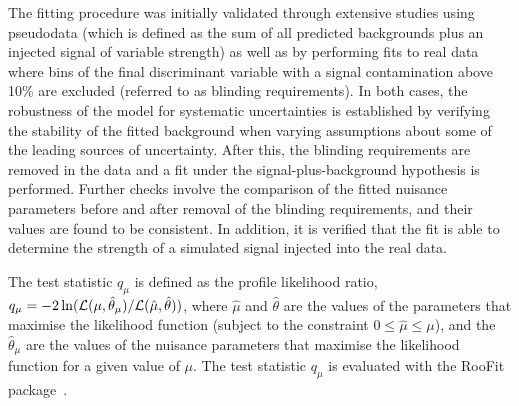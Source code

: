 The fitting procedure was initially validated through extensive studies using pseudodata (which is defined as the sum of all predicted backgrounds 
plus an injected signal of variable strength) as well as by performing fits to real data where bins of the final discriminant variable with 
a signal contamination above 10\% are excluded (referred to as blinding requirements).
In both cases, the robustness of the model for systematic uncertainties is established by verifying the stability of the fitted background 
when varying assumptions about some of the leading sources of uncertainty. 
After this, the blinding requirements
are removed in the data and a fit under the signal-plus-background hypothesis is performed. Further checks involve the comparison of the fitted 
nuisance parameters before and after removal of the blinding requirements, and their values are found to be consistent. In addition, it is verified that the 
fit is able to determine the strength of a simulated signal injected into the real data.

The test statistic $q_\mu$ is defined as the profile likelihood ratio, 
$q_\mu = -2\ln({\cal L}(\mu,{\hat{\theta}}_\mu)/{\cal L}(\hat{\mu},\hat{\theta}))$,
where $\hat{\mu}$ and $\hat{\theta}$ are the values of the parameters that
maximise the likelihood function (subject to the constraint $0\leq \hat{\mu} \leq \mu$), and the ${\hat{\theta}}_\mu$ are the values of the
nuisance parameters that maximise the likelihood function for a given value of $\mu$. 
The test statistic $q_\mu$ is evaluated with the {\textsc RooFit} package~\cite{Verkerke:2003ir,RooFitManual}.

